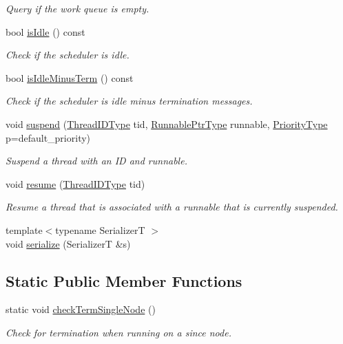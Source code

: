 \begin{DoxyCompactItemize}
\begin{DoxyCompactList}\small\item\em Query if the work queue is empty. \end{DoxyCompactList}\item 
bool \hyperlink{structvt_1_1sched_1_1_scheduler_a047e7a211a220c2729c51c36271c7bf1}{is\+Idle} () const
\begin{DoxyCompactList}\small\item\em Check if the scheduler is idle. \end{DoxyCompactList}\item 
bool \hyperlink{structvt_1_1sched_1_1_scheduler_a3229e007ac15bfb1d337428a52157817}{is\+Idle\+Minus\+Term} () const
\begin{DoxyCompactList}\small\item\em Check if the scheduler is idle minus termination messages. \end{DoxyCompactList}\item 
void \hyperlink{structvt_1_1sched_1_1_scheduler_a9d29a90bbdd1cadd49a4d53415bfdb1a}{suspend} (\hyperlink{namespacevt_a9b887d814dd25ff495a0c8270304ac02}{Thread\+I\+D\+Type} tid, \hyperlink{structvt_1_1sched_1_1_scheduler_a0bc4ead96e12a5c516afebc8b1cb0b79}{Runnable\+Ptr\+Type} runnable, \hyperlink{namespacevt_a86bff9f556eb761b27fc8600d006ac04}{Priority\+Type} p=default\+\_\+priority)
\begin{DoxyCompactList}\small\item\em Suspend a thread with an ID and runnable. \end{DoxyCompactList}\item 
void \hyperlink{structvt_1_1sched_1_1_scheduler_aae177a07ed61e9de5caeab0fefef577a}{resume} (\hyperlink{namespacevt_a9b887d814dd25ff495a0c8270304ac02}{Thread\+I\+D\+Type} tid)
\begin{DoxyCompactList}\small\item\em Resume a thread that is associated with a runnable that is currently suspended. \end{DoxyCompactList}\item 
{\footnotesize template$<$typename SerializerT $>$ }\\void \hyperlink{structvt_1_1sched_1_1_scheduler_ac4221da465bbe5d3acaa56c8c099ef7b}{serialize} (SerializerT \&s)
\end{DoxyCompactItemize}
\subsection*{Static Public Member Functions}
\begin{DoxyCompactItemize}
\item 
static void \hyperlink{structvt_1_1sched_1_1_scheduler_ad1b05fb0d94a3e707d7733ef5206b7c8}{check\+Term\+Single\+Node} ()
\begin{DoxyCompactList}\small\item\em Check for termination when running on a since node. \end{DoxyCompactList}\end{DoxyCompactItemize}

